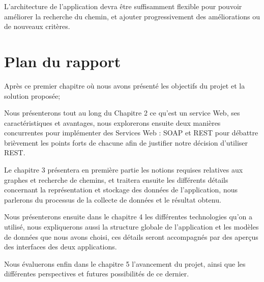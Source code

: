 L'architecture de l'application devra être suffisamment flexible pour pouvoir améliorer la recherche du chemin, et ajouter progressivement des améliorations ou de nouveaux critères.
\newpage
\section{Plan du rapport}

Après ce premier chapitre où nous avons présenté les objectifs du projet et la solution proposée;\newline

Nous présenterons tout au long du Chapitre 2 ce qu'est un service Web, ses caractéristiques et avantages, nous explorerons ensuite deux manières concurrentes pour implémenter des Services Web : SOAP et REST pour débattre brièvement les points forts de chacune afin de justifier notre décision d'utiliser REST.\newline\newline

Le chapitre 3 présentera en première partie les notions requises relatives aux graphes et recherche de chemins, et traitera ensuite les différents détails concernant la représentation et stockage des données de l'application, nous parlerons du processus de la collecte de données et le résultat obtenu. \newline\newline


Nous présenterons ensuite dans le chapitre 4 les différentes technologies qu'on a utilisé, nous expliquerons aussi la structure globale de l'application et les modèles de données que nous avons choisi, ces détails seront accompagnés par des aperçus des interfaces des deux applications.\newline\newline

Nous évaluerons enfin dans le chapitre 5 l'avancement du projet, ainsi que les différentes perspectives et futures possibilités de ce dernier.
